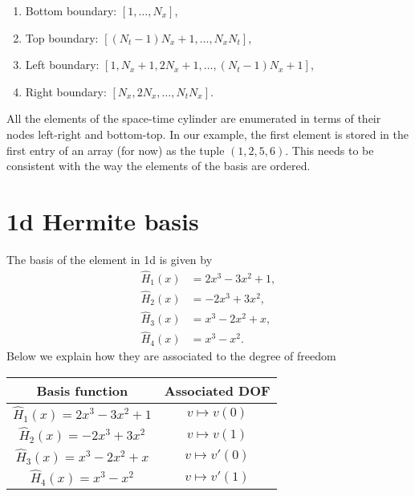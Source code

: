\documentclass[]{report}
\begin{document}
    \begin{enumerate}
        \item Bottom boundary: $[1,\dots,N_x]$,
        \item Top boundary: $[(N_t - 1)N_x + 1, \dots, N_x N_t]$,
        \item Left boundary: $[1, N_x + 1, 2N_x + 1, \dots, (N_t - 1) N_x + 1]$,
        \item Right boundary: $[N_x, 2N_x, \dots, N_t N_x]$.
    \end{enumerate}
    All the elements of the space-time cylinder are enumerated in terms of their nodes left-right and bottom-top. In our example, the first element is stored in the first entry of an array (for now) as the tuple $(1,2,5,6)$. This needs to be consistent with the way the elements of the basis are ordered.
    \section*{1d Hermite basis}
    The basis of the element in 1d is given by
    \begin{align*}
        \hat H_1(x) &= 2x^3-3x^2+1, \\
        \hat H_2(x) &= -2x^3+3x^2, \\
        \hat H_3(x) &= x^3-2x^2+x, \\
        \hat H_4(x) &= x^3 - x^2.
    \end{align*}
    Below we explain how they are associated to the degree of freedom
    \begin{center}
        \begin{tabular}[]{|c|c|}
            \hline
            Basis function & Associated DOF \\
            \hline \hline
            $\hat{H}_1(x) = 2x^3-3x^2+1$ & $v \mapsto v(0)$ \\
            \hline
            $\hat{H}_2(x) = -2x^3+3x^2$ & $v \mapsto v(1)$ \\
            \hline
            $\hat{H}_3(x) = x^3-2x^2+x$ & $v \mapsto v'(0)$ \\ 
            \hline
            $\hat{H}_4(x) = x^3 - x^2$ & $v \mapsto v'(1)$ \\
            \hline
        \end{tabular}
    \end{center}
\end{document}
